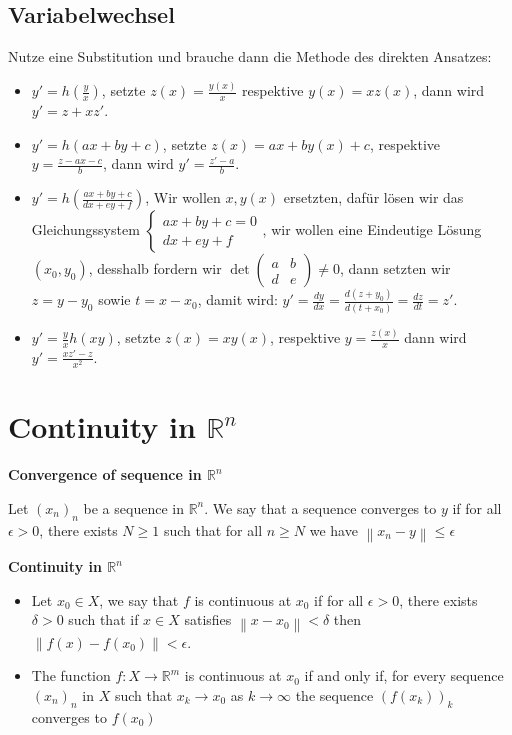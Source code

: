 \documentclass[25pt]{sciposter}
\newcommand{\R}{\mathbb{R}}
\newcommand{\norm}[1]{\left\lVert#1\right\rVert}
\newenvironment{method}[1]{\begin{mdframed}[backgroundcolor=blue!10,innertopmargin=15pt, innerbottommargin=15pt, nobreak=true]
		\textbf{#1 }
	}
	{ 
	\end{mdframed}
}
\begin{document}
\begin{multicols}{3}
\subsection*{Variabelwechsel}
Nutze eine Substitution und brauche dann die Methode des direkten Ansatzes:
\begin{itemize}
	\item $\boxed{y' = h\left(\frac{y}{x}\right)}$, setzte $z(x) = \frac{y(x)}{x}$ respektive $y(x) = xz(x)$, dann wird $y' = z+xz'$.
	\item $\boxed{y' = h(ax+by+c)}$, setzte $z(x) = ax + by(x)+c$, respektive $y = \frac{z-ax-c}{b}$, dann wird $y' = \frac{z' -a}{b}$.
	\item $\boxed{y' = h \left(\frac{ax+by+c}{dx+ey+f}\right) }$, Wir wollen $x,y(x)$ ersetzten, dafür lösen wir das Gleichungssystem $\left\{
	\begin{array}{ll}
	ax + by+c = 0 \\
	dx+ey+f 
	\end{array}
	\right.$, wir wollen eine Eindeutige Lösung $(x_0,y_0)$, desshalb fordern wir $\operatorname{det}\begin{pmatrix}
	a & b \\ d & e
	\end{pmatrix} \neq 0$, dann setzten wir $z = y-y_0$ sowie $t = x-x_0$, damit wird: $y' = \frac{dy}{dx} = \frac{d(z+y_0)}{d(t+x_0)} = \frac{dz}{dt} = z'$.
	\item $\boxed{y' = \frac{y}{x} h(xy)}$, setzte $z(x) = xy(x)$, respektive $y = \frac{z(x)}{x}$ dann wird $y' = \frac{xz' - z}{x^2}$.
\end{itemize}






\section*{Continuity in $\R^n$}
\begin{method}{Convergence of sequence in $\R^n$}
	Let $(x_n)_n$ be a sequence  in $\R^n$. We say that a sequence converges to $y$ if for all $\epsilon > 0$, there exists $N \geq 1$ such that for all $n \geq N$ we have $\norm{x_n-y}\leq \epsilon$
\end{method}

\begin{method}{Continuity in $\R^n$}
	\begin{itemize}
		\item 	Let $x_0\in X$, we say that $f$ is continuous at $x_0$ if for all $\epsilon> 0$, there exists $\delta > 0$ such that if $x\in X$ satisfies $\norm{x-x_0}<\delta$ then $\norm{f(x) -f(x_0)}<\epsilon$.
		\item The function $f:X\to \R^m$ is continuous at $x_0$ if and only if, for every sequence $(x_n)_n$ in $X$ such that $x_k\to x_0$ as $k \to \infty$ the sequence $(f(x_k))_k$ converges to $f(x_0)$
	\end{itemize}
\end{method}



\end{multicols}
\end{document}
